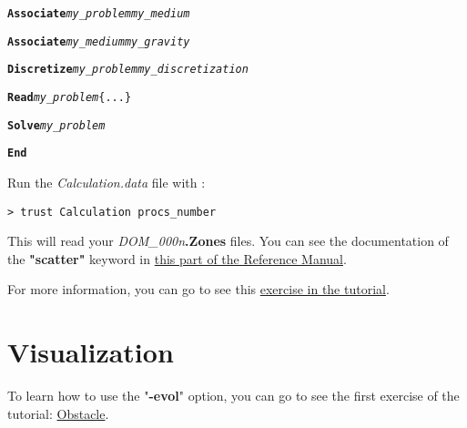 \begin{itemize}
\begin{center}
{\begin{minipage}[c]{0.8\textwidth}
\begin{alltt}
{\bf{Associate}} \textit{my\_problem my\_medium}

{\bf{Associate}} \textit{my\_medium my\_gravity}


{\bf{Discretize}} \textit{my\_problem my\_discretization}


{\bf{Read}} \textit{my\_problem} \{ ... \}


{\bf{Solve}} \textit{my\_problem}


{\bf{End}}
\end{alltt}
\end{minipage}}
\end{center}

Run the \textit{Calculation.data} file with \trust:
\begin{verbatim}
> trust Calculation procs_number
\end{verbatim}


This will read your \textit{DOM\_000n}\textbf{.Zones} files. You can see the documentation of the \textbf{"scatter"} keyword in \href{\REFERENCEMANUAL\#scatter}{this part of the \trustref Reference Manual}.\\
\end{itemize}


For more information, you can go to see this \href{TRUST_tutorial.pdf\#exo_para_1}{exercise in the \trust tutorial}.




\section{Visualization}
To learn how to use the "\textbf{-evol}" option, you can go to see the first exercise of the \trust tutorial: \href{TRUST_tutorial.pdf\#exo1}{Obstacle}.


